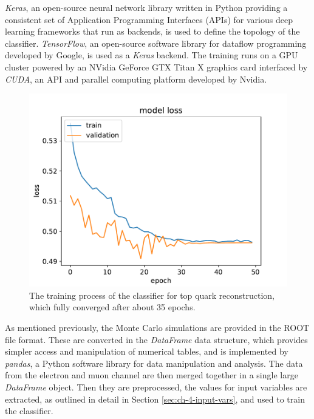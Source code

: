 \emph{Keras}, an open-source neural network library written in Python providing a consistent set of Application Programming Interfaces (APIs) for various deep learning frameworks that run as backends, is used to define the topology of the classifier. \emph{TensorFlow}, an open-source software library for dataflow programming developed by Google, is used as a \emph{Keras} backend. The training runs on a GPU cluster powered by an NVidia GeForce GTX Titan X \cite{misc:geforce} graphics card interfaced by \emph{CUDA}, an API and parallel computing platform developed by Nvidia.

\begin{figure}[h]
    \centering
    \includegraphics[scale=.75]{assets/chap04/model_loss.pdf}
    \caption{The training process of the classifier for top quark reconstruction, which fully converged after about 35 epochs.}
    \label{fig:ch_4_loss}
\end{figure}

As mentioned previously, the Monte Carlo simulations are provided in the ROOT file format. These are converted in the \emph{DataFrame} data structure, which provides simpler access and manipulation of numerical tables, and is implemented by \emph{pandas}, a Python software library for data manipulation and analysis. The data from the electron and muon channel are then merged together in a single large \emph{DataFrame} object. Then they are preprocessed, the values for input variables are extracted, as outlined in detail in Section \ref{sec:ch-4-input-vars}, and used to train the classifier.

